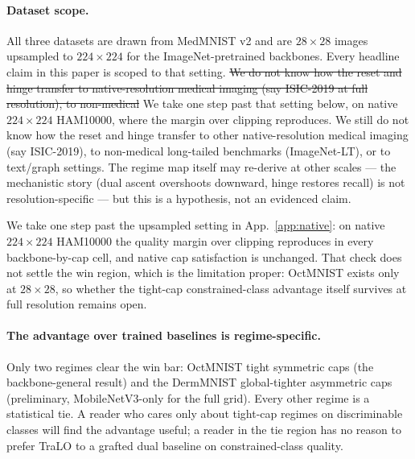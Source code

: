 \documentclass[10pt]{article}
\newcommand{\del}[1]{{\color{red}\sout{#1}}}
\begin{document}
\paragraph{Dataset scope.}
All three datasets are drawn from MedMNIST v2 and are $28{\times}28$
images upsampled to $224{\times}224$ for the ImageNet-pretrained
backbones. Every headline claim in this paper is scoped to that setting.
\del{We do not know how the reset and hinge transfer to native-resolution
medical imaging (say ISIC-2019 at full resolution), to non-medical}
{\color{blue}We take one step past that setting below, on native
$224{\times}224$ HAM10000, where the margin over clipping reproduces. We
still do not know how the reset and hinge transfer to other
native-resolution medical imaging (say ISIC-2019), to non-medical}
long-tailed benchmarks (ImageNet-LT), or to text/graph settings. The
regime map itself may re-derive at other scales --- the mechanistic story
(dual ascent overshoots downward, hinge restores recall) is not
resolution-specific --- but this is a hypothesis, not an evidenced claim.

{\color{blue}We take one step past the upsampled setting in App.~\ref{app:native}:
on native $224{\times}224$ HAM10000 the quality margin over clipping reproduces in
every backbone-by-cap cell, and native cap satisfaction is unchanged. That check
does not settle the win region, which is the limitation proper: OctMNIST exists
only at $28{\times}28$, so whether the tight-cap constrained-class advantage itself
survives at full resolution remains open.}

\paragraph{The advantage over trained baselines is regime-specific.}
Only two regimes clear the win bar: OctMNIST tight symmetric caps (the
backbone-general result) and the DermMNIST global-tighter asymmetric caps
(preliminary, MobileNetV3-only for the full grid). Every other regime is
a statistical tie. A reader who cares only about tight-cap regimes on
discriminable classes will find the advantage useful; a reader in the
tie region has no reason to prefer TraLO to a grafted dual baseline on
constrained-class quality.
\end{document}

